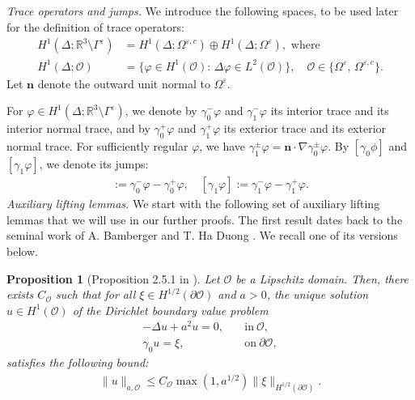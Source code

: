 \documentclass[]{article}
\newtheorem{proposition}{Proposition}
\numberwithin{equation}{section}
\numberwithin{theorem}{section}
\numberwithin{lemma}{section}
\numberwithin{corollary}{section}
\numberwithin{proposition}{section}
\numberwithin{definition}{section}
\newcommand{\mypar}[1]{\noindent\textit{#1}\hspace{0.1em}}
\newcommand{\re}{\varepsilon}
\renewcommand{\vec}{\boldsymbol}
\begin{document}
\begin{appendices}
		\mypar{Trace operators and jumps.} 
		We introduce the following spaces, to be used later for the definition of trace operators:
		\begin{align*}%
			H^1(\Delta;\mathbb{R}^3 \setminus \Gamma^{\re})&=H^1(\Delta; \Omega^{\re,c})\oplus H^1(\Delta; \Omega^{\re}), \text{ where }\\
			H^1(\Delta; \mathcal{O})&=\{\varphi\in H^1(\mathcal{O}): \, \Delta \varphi \in L^2(\mathcal{O})\}, \quad \mathcal{O}\in \{\Omega^{\re}, \, \Omega^{\re,c}\}.
		\end{align*}
		Let $\vec{n}$ denote the outward unit normal to $\Omega^{\re}$. 
		
		For $\varphi \in H^1(\Delta;\mathbb{R}^3 \setminus \Gamma^{\re})$, we denote by $\gamma^{-}_0 \varphi$ and $\gamma^{-}_1 \varphi$ its interior trace and its interior normal trace, and by $\gamma^{+}_0 \varphi$ and $\gamma^{+}_1 \varphi$ its exterior trace and its exterior normal trace. For sufficiently regular $\varphi$, we have $\gamma^{\pm }_1 \varphi = \vec{n} \cdot \nabla \gamma^{\pm}_{0} \varphi$. By $[\gamma_0 \phi]$ and $[\gamma_1 \varphi]$, we denote its jumps:
		\begin{align*}%
			[\gamma_0 \varphi] := \gamma^{-}_0 \varphi - \gamma^{+}_0 \varphi, \quad [\gamma_1 \varphi] := \gamma^{-}_1 \varphi - \gamma^{+}_1 \varphi.
		\end{align*}
		\mypar{Auxiliary lifting lemmas.}
		We start with the following set of auxiliary lifting lemmas that we will use in our further proofs. The first result dates back to the seminal work of A. Bamberger and T. Ha Duong \cite{bamberger_ha_duong}. We recall one of its versions below.
		\begin{proposition}[Proposition 2.5.1 in \cite{sayas}]
			\label{prop:sayas}
			Let $\mathcal{O}$ be a Lipschitz domain. Then, there exists $C_{\mathcal{O}}$ such that for all $\xi \in H^{1/2}( \partial \mathcal{O})$ and $a>0$, the unique solution $u \in H^1(\mathcal{O})$ of the Dirichlet boundary value problem 
			\begin{align*}%
				- \Delta u + a^2 u = 0, \quad  &\text{in} ~ \mathcal{O}, \\
				\gamma_0 u = \xi, \quad &\text{on} ~ \partial \mathcal{O},
			\end{align*}
			satisfies the following bound: 
			\begin{align}
				\label{eq:energy_norm_bound}
				\| u \|_{a, \mathcal{O}} \leq C_{\mathcal{O}} \max(1, a^{1/2}) \| \xi \|_{H^{1/2}(\partial \mathcal{O})}.
			\end{align}
			

\end{proposition}
\end{appendices}
\end{document}

